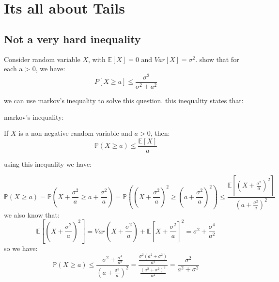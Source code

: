\section{ Its all about Tails}
\subsection{Not a very hard inequality}
Consider random variable $X$, with $\mathbb{E}[X] = 0$ and $Var[X] = \sigma ^2$.
show that for each a > 0, we have:
$$P[X \geq a] \leq \dfrac{\sigma^2}{\sigma^2 + a^2}$$
\begin{qsolve}
	we can use markov's inequality to solve this question. this inequality states that:
	\begin{qsolve}[]
		\begin{center}
			markov's inequality:
		\end{center}
		If $X$ is a non-negative random variable and $a > 0$, then:
		$$\mathbb{P}(X \geq a) \leq \dfrac{\mathbb{E}[X]}{a}$$
	\end{qsolve}
		using this inequality we have:
	\begin{qsolve}[]
		$$\mathbb{P}(X \geq a) = \mathbb{P}(X + \frac{\sigma ^2 }{a} \geq a + \frac{\sigma ^2 }{a}) = \mathbb{P}((X+ \frac{\sigma ^2 }{a})^2 \geq (a + \frac{\sigma ^2 }{a})^2) \leq \dfrac{\mathbb{E}[(X+ \frac{\sigma ^2 }{a})^2]}{(a + \frac{\sigma ^2 }{a})^2}$$
		we also know that:
		$$\mathbb{E}[(X+ \frac{\sigma ^2 }{a})^2] = Var(X + \frac{\sigma ^2 }{a}) + \mathbb{E}[X + \frac{\sigma ^2 }{a}]^2 = \sigma ^2 + \frac{\sigma ^4 }{a^2}$$
		so we have:
		$$\mathbb{P}(X \geq a) \leq \dfrac{\sigma ^2 + \frac{\sigma ^4 }{a^2}}{(a + \frac{\sigma ^2 }{a})^2} = \dfrac{\frac{\sigma ^2 (a^2 + \sigma ^2)}{a^2}}{\frac{(a^2 + \sigma^2)^2}{a^2}} = \dfrac{\sigma ^2}{a^2 + \sigma^2}$$
	\end{qsolve}
\end{qsolve}
